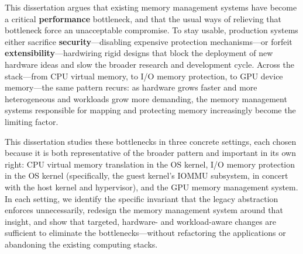 This dissertation argues that existing memory management systems have become a
critical \textbf{performance} bottleneck, and that the usual ways of relieving that
bottleneck force an unacceptable compromise.
To stay usable, production systems either sacrifice \textbf{security}---disabling
expensive protection mechanisms---or forfeit \textbf{extensibility}---hardwiring rigid
designs that block the deployment of new hardware ideas and slow the broader research
and development cycle.
Across the stack---from CPU virtual memory, to I/O memory protection, to GPU
device memory---the same pattern recurs:
as hardware grows faster and more heterogeneous and workloads grow more demanding,
the memory management systems responsible for mapping and protecting memory
increasingly become the limiting factor.

This dissertation studies these bottlenecks in three concrete settings, each chosen
because it is both representative of the broader pattern and important in its
own right:
CPU virtual memory translation in the OS kernel,
I/O memory protection in the OS kernel (specifically, the guest kernel's IOMMU
subsystem, in concert with the host kernel and hypervisor),
and the GPU memory management system.
In each setting, we identify the specific invariant that the legacy abstraction
enforces unnecessarily, redesign the memory management system around that insight,
and show that targeted, hardware- and workload-aware changes are sufficient to
eliminate the bottlenecks---without refactoring the applications or abandoning the
existing computing stacks.

